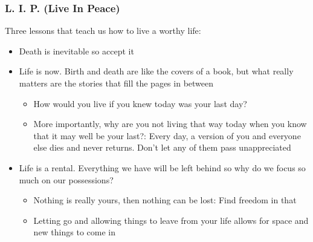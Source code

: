 \begin{frame}[fragile]\frametitle{L. I. P. (Live In Peace)}
Three lessons that teach us how to live a worthy life:

\begin{itemize}
\item Death is inevitable so accept it
\item Life is now. Birth and death are like the covers of a book, but what really matters are the stories that fill the pages in between
	\begin{itemize}
	\item How would you live if you knew today was your last day?
	\item More importantly, why are you not living that way today when you know that it may well be your last?: Every day, a version of you and everyone else dies and never returns. Don’t let any of them pass unappreciated
	\end{itemize}
\item Life is a rental. Everything we have will be left behind so why do we focus so much on our possessions?
	\begin{itemize}
	\item Nothing is really yours, then nothing can be lost: Find freedom in that
	\item Letting go and allowing things to leave from your life allows for space and new things to come in
	\end{itemize}

\end{itemize}

\end{frame}

